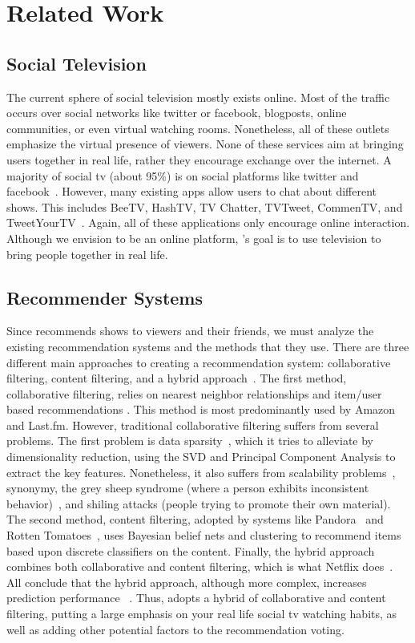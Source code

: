 \section{Related Work}

\subsection{Social Television}
The current sphere of social television mostly exists online.  Most of the traffic occurs over social networks like twitter or facebook, blogposts, online communities, or even virtual watching rooms.  Nonetheless, all of
these outlets emphasize the virtual presence of viewers.  None of these services aim at bringing users together in real life, rather they encourage exchange over the internet.  A majority of social tv
(about 95\%) is on social platforms like twitter and facebook~\cite{chausse}.  However, many existing apps allow users to chat about different shows.  This includes BeeTV, HashTV, TV Chatter, TVTweet, CommenTV, and TweetYourTV~\cite{chausse}.  Again, all of these applications only encourage online interaction.  Although we envision {\sys} to be an online platform, {\sys}'s goal is to use television to bring people together in real life.

\subsection{Recommender Systems} 
\label{sec:recommender}
Since {\sys} recommends shows to viewers and their friends, we must analyze the existing recommendation systems and the methods that they use.  There are three different main approaches to creating a recommendation system: collaborative filtering, content filtering, and a hybrid
approach~\cite{su,vozalis}.  The first method, collaborative
filtering, relies on nearest neighbor relationships and item/user
based recommendations \cite{su}.  This method is most predominantly
used by Amazon and Last.fm.  However, traditional collaborative
filtering suffers from several problems.  The first problem is data
sparsity~\cite{su,melville}, which it tries to alleviate by
dimensionality reduction, using the SVD and Principal Component
Analysis to extract the key features.  Nonetheless, it also suffers
from scalability problems~\cite{papagelis}, synonymy, the grey sheep
syndrome (where a person exhibits inconsistent behavior)~\cite{su},
and shiling attacks (people trying to promote their own material).
The second method, content filtering, adopted by systems like Pandora~\cite{pandora}
and Rotten Tomatoes~\cite{rotten}, uses Bayesian belief nets and clustering to
recommend items based upon discrete classifiers on the content.
Finally, the hybrid approach combines both collaborative and content
filtering, which is what Netflix does~\cite{netflix}.  All conclude that the hybrid approach, although more complex, increases prediction performance ~\cite{su,melville}.  Thus, {\sys} adopts a hybrid of collaborative
and content filtering, putting a large emphasis on your real life social tv watching habits, as well as adding other potential factors to the recommendation voting.

